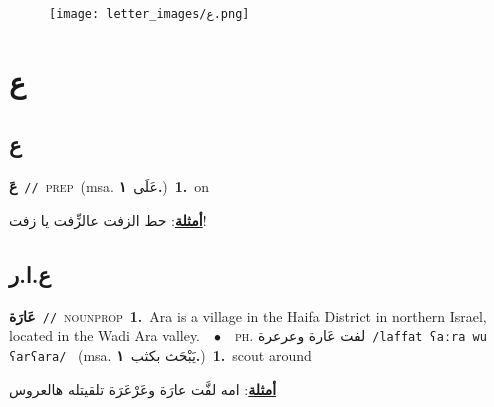 \documentclass[10pt,a4paper,twoside]{article} %
\begin{document}
\begin{figure*}[t!]\centering\texttt{[image: letter\_images/ع.png]}\end{figure*}
\color{white}

 \section*{\foreignlanguage{arabic}{ع}} 
 \begin{multicols}{2} 

%
\color{black}
\vspace{-3mm}
\subsection*{\color{blue}\foreignlanguage{arabic}{ع}\color{blue}{ (ntws)}} 

{\setlength\topsep{0pt}\textbf{\foreignlanguage{arabic}{عَ}}\ {\color{gray}\texttt{//}\color{black}}\ \textsc{prep}\ \color{gray}(msa. \foreignlanguage{arabic}{عَلَى}~\foreignlanguage{arabic}{\textbf{١.}})\color{black}\ \textbf{1.}~on\  \begin{flushright}\color{gray}\foreignlanguage{arabic}{\textbf{\underline{\foreignlanguage{arabic}{أمثلة}}}: حط الزفت عالزِّفت يا زفت!}\end{flushright}\color{black}} \vspace{2mm}

\vspace{-3mm}
\subsection*{\color{blue}\foreignlanguage{arabic}{ع.ا.ر}\color{blue}{ (ntws)}} 

{\setlength\topsep{0pt}\textbf{\foreignlanguage{arabic}{عَارَة}}\ {\color{gray}\texttt{//}\color{black}}\ \textsc{noun\textunderscore prop}\ \textbf{1.}~Ara is a village in the Haifa District in northern Israel, located in the Wadi Ara valley.\ \ $\bullet$\ \ \textsc{ph.} \color{gray} \foreignlanguage{arabic}{لفت عَارة وعرعرة}\color{black}\ {\color{gray}\texttt{/{\sffamily laffat ʕaːra wu ʕarʕara}/}\color{black}}\ \color{gray} (msa. \foreignlanguage{arabic}{يَبْحَث بكثب}~\foreignlanguage{arabic}{\textbf{١.}})\color{black}\ \textbf{1.}~scout around\  \begin{flushright}\color{gray}\foreignlanguage{arabic}{\textbf{\underline{\foreignlanguage{arabic}{أمثلة}}}: امه لفَّت عارَة وعَرْعَرَة تلقيتله هالعروس}\end{flushright}\color{black}} \vspace{2mm}


\end{multicols}
\end{document}
